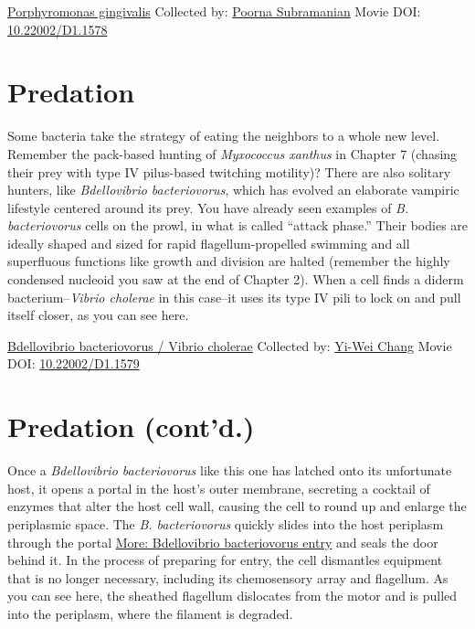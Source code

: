 \documentclass[]{tufte-book}
\begin{document}
\hypertarget{htmlwidget-4ba428b2cb4afdd0aab5}{}

\label{fig:9-8}\protect\hyperlink{tree}{Porphyromonas gingivalis} Collected by: \protect\hyperlink{poorna_subramanian}{Poorna Subramanian} Movie DOI: \href{https://doi.org/10.22002/D1.1578}{10.22002/D1.1578}

\hypertarget{predation}{%
\section{Predation}\label{predation}}

Some bacteria take the strategy of eating the neighbors to a whole new level. Remember the pack-based hunting of \emph{Myxococcus xanthus} in Chapter 7 (chasing their prey with type IV pilus-based twitching motility)? There are also solitary hunters, like \emph{Bdellovibrio bacteriovorus}, which has evolved an elaborate vampiric lifestyle centered around its prey. You have already seen examples of \emph{B. bacteriovorus} cells on the prowl, in what is called ``attack phase.'' Their bodies are ideally shaped and sized for rapid flagellum-propelled swimming and all superfluous functions like growth and division are halted (remember the highly condensed nucleoid you saw at the end of Chapter 2). When a cell finds a diderm bacterium--\emph{Vibrio cholerae} in this case--it uses its type IV pili to lock on and pull itself closer, as you can see here.



\hypertarget{htmlwidget-31d1fb9520f2229ae7fb}{}

\label{fig:9-9}\protect\hyperlink{tree}{Bdellovibrio bacteriovorus / Vibrio cholerae} Collected by: \protect\hyperlink{yi-wei_chang}{Yi-Wei Chang} Movie DOI: \href{https://doi.org/10.22002/D1.1579}{10.22002/D1.1579}

\hypertarget{predation-contd.}{%
\section{Predation (cont'd.)}\label{predation-contd.}}

Once a \emph{Bdellovibrio bacteriovorus} like this one has latched onto its unfortunate host, it opens a portal in the host's outer membrane, secreting a cocktail of enzymes that alter the host cell wall, causing the cell to round up and enlarge the periplasmic space. The \emph{B. bacteriovorus} quickly slides into the host periplasm through the portal \protect\hyperlink{Bdellovibrio_bacteriovorus_entry}{More: Bdellovibrio bacteriovorus entry} and seals the door behind it. In the process of preparing for entry, the cell dismantles equipment that is no longer necessary, including its chemosensory array and flagellum. As you can see here, the sheathed flagellum dislocates from the motor and is pulled into the periplasm, where the filament is degraded.
\end{document}
